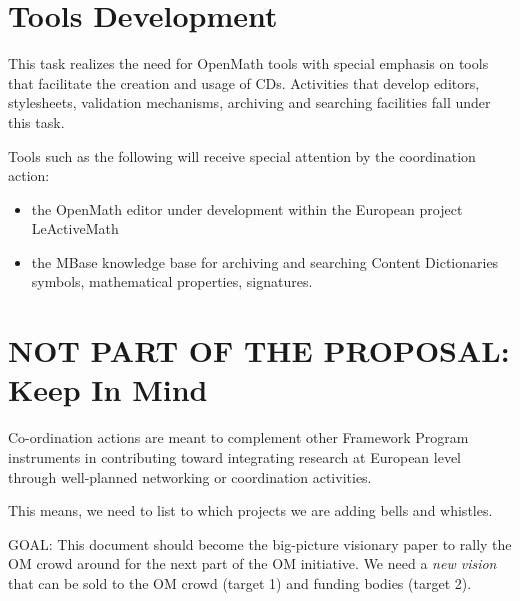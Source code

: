 \documentclass[draft]{artikel3}
\begin{document}
\section{Tools Development} 
\label{tools}

This task realizes the need for OpenMath tools with special emphasis
on tools that facilitate the creation and usage of CDs. Activities
that develop editors, stylesheets, validation mechanisms, archiving
and searching facilities fall under this task.

Tools such as the following will receive special attention by the
coordination action: 
\begin{itemize}
\item the OpenMath editor under development within the European
  project LeActiveMath
\item the MBase knowledge base for archiving and searching Content
  Dictionaries symbols, mathematical properties, signatures.


\end{itemize}



\newpage

\section{NOT PART OF THE PROPOSAL:  Keep In Mind}
Co-ordination actions are meant to complement other Framework Program
instruments in contributing toward integrating research at European
level through well-planned networking or coordination activities.

This means, we need to list to which projects we are adding bells and
whistles.

GOAL: This document should become the big-picture visionary paper to
rally the OM crowd around for the next part of the OM initiative.  We
need a \emph{new vision} that can be sold to the OM crowd (target 1)
and funding bodies (target 2).
\end{document}
